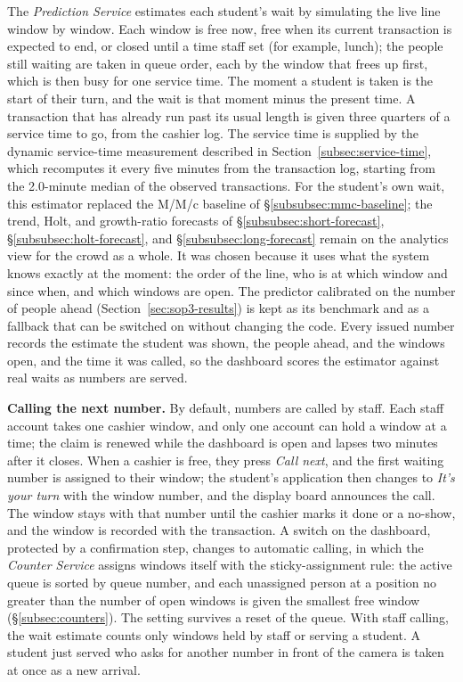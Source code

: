 \documentclass{research}
\begin{document}
The \emph{Prediction Service} estimates each student's wait by simulating
the live line window by window. Each window is free now, free when its
current transaction is expected to end, or closed until a time staff set
(for example, lunch); the people still waiting are taken in queue order,
each by the window that frees up first, which is then busy for one
service time. The moment a student is taken is the start of their turn,
and the wait is that moment minus the present time. A transaction that
has already run past its usual length is given three quarters of a
service time to go, from the cashier log. The service time is supplied by
the dynamic service-time measurement described in
Section~\ref{subsec:service-time}, which recomputes it every five minutes
from the transaction log, starting from the 2.0-minute median of the
observed transactions. For the student's own wait, this estimator
replaced the M/M/c baseline of \S\ref{subsubsec:mmc-baseline}; the
trend, Holt, and growth-ratio forecasts of
\S\ref{subsubsec:short-forecast}, \S\ref{subsubsec:holt-forecast}, and
\S\ref{subsubsec:long-forecast} remain on the analytics view for the
crowd as a whole. It was chosen because it uses what the system knows
exactly at the moment: the order
of the line, who is at which window and since when, and which windows
are open. The predictor calibrated on the number of people ahead
(Section~\ref{sec:sop3-results}) is kept as its benchmark and as a
fallback that can be switched on without changing the code. Every issued
number records the estimate the student was shown, the people ahead, and
the windows open, and the time it was called, so the dashboard scores the
estimator against real waits as numbers are served.

\textbf{Calling the next number.}\label{cr:calling} By default, numbers are called by
staff. Each staff account takes one cashier window, and only one account
can hold a window at a time; the claim is renewed while the dashboard is
open and lapses two minutes after it closes. When a cashier is free, they
press \emph{Call next}, and the first waiting number is assigned to their
window; the student's application then changes to \emph{It's your turn}
with the window number, and the display board announces the call. The
window stays with that number until the cashier marks it done or a
no-show, and the window is recorded with the transaction. A switch on
the dashboard, protected by a confirmation step, changes to automatic
calling, in which the \emph{Counter Service} assigns windows itself with
the sticky-assignment rule: the active queue is sorted by queue number,
and each unassigned person at a position no greater than the number of
open windows is given the smallest free window
(\S\ref{subsec:counters}). The setting survives a reset of the queue.
With staff calling, the wait estimate counts only windows held by staff
or serving a student. A student just served who asks for another number
in front of the camera is taken at once as a new arrival.
\end{document}
